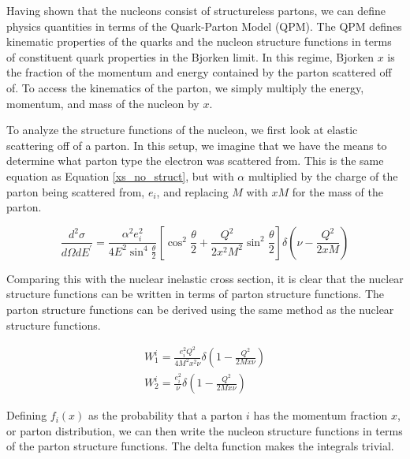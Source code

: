 
Having shown that the nucleons consist of structureless partons, we can define physics quantities in terms of the Quark-Parton Model (QPM). The QPM defines kinematic properties of the quarks and the nucleon structure functions in terms of constituent quark properties in the Bjorken limit. In this regime, Bjorken $x$ is the fraction of the momentum and energy contained by the parton scattered off of. To access the kinematics of the parton, we simply multiply the energy, momentum, and mass of the nucleon by $x$.

To analyze the structure functions of the nucleon, we first look at elastic scattering off of a parton. In this setup, we imagine that we have the means to determine what parton type the electron was scattered from. This is the same equation as Equation \ref{xs_no_struct}, but with $\alpha$ multiplied by the charge of the parton being scattered from, $e_i$, and replacing $M$ with $xM$ for the mass of the parton.

\begin{equation}
	\frac{d^2\sigma}{d\Omega dE^\prime} = \frac{\alpha^{2}e_{i}^{2}}{4E^{2}\sin^{4}\frac{\theta}{2}} \left[\cos^{2}\frac{\theta}{2} + \frac{Q^2}{2x^2M^2}\sin^{2}\frac{\theta}{2}\right] \delta\left(\nu-\frac{Q^2}{2xM}\right)
\end{equation}

Comparing this with the nuclear inelastic cross section, it is clear that the nuclear structure functions can be written in terms of parton structure functions. The parton structure functions can be derived using the same method as the nuclear structure functions.

\begin{subequations}
\begin{align}
	W_1^i = \frac{e_{i}^{2}Q^2}{4M^{2}x^{2}\nu}\delta\left(1-\frac{Q^2}{2Mx\nu}\right) \\
	W_2^i = \frac{e_{i}^{2}}{\nu}\delta\left(1-\frac{Q^2}{2Mx\nu}\right)
\end{align}
\end{subequations}

Defining $f_{i}\left(x\right)$ as the probability that a parton $i$ has the momentum fraction $x$, or parton distribution, we can then write the nucleon structure functions in terms of the parton structure functions. The delta function makes the integrals trivial.

